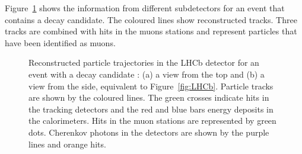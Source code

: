 Figure~\ref{fig:event} shows the information from different subdetectors for an event that contains a \BstoJpsiKK{} decay candidate. The
coloured lines show reconstructed tracks. Three tracks are combined with hits in the muons stations and represent particles that have been
identified as muons.
\begin{figure}[ptb]
  \centering
  \caption{Reconstructed particle trajectories in the LHCb detector for an event with a \BstoJpsiKK{} decay candidate \cite{vanEijk:2012}:
           (a) a view from the top and (b) a view from the side, equivalent to Figure~\ref{fig:LHCb}.
           Particle tracks are shown by the coloured lines. The green crosses indicate hits in the tracking detectors and the red and blue
           bars energy deposits in the calorimeters. Hits in the muon stations are represented by green dots. Cherenkov photons in the
           \rich{} detectors are shown by the purple lines and orange hits.}
  \label{fig:event}
\end{figure}
